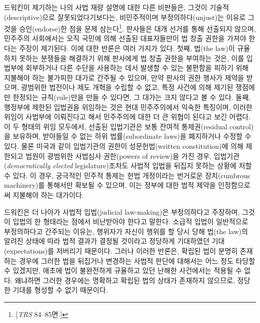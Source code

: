 드워킨이 제기하는 나의 사법 재량 설명에 대한 다른 비판들은, 그것이
기술적(descriptive)으로 잘못되었다기보다는, 비민주적이며
부정의하다(unjust)는 이유로 그것을 승인(endorse)한 점을 문제
삼는다\footnote{{[}\emph{TRS} 84--85면.{]}}. 판사들은 대개 선거를 통해
선출되지 않으며, 민주주의 사회에서는 오직 국민에 의해 선출된
대표자들만이 법 창출 권한을 가져야 한다는 주장이 제기된다. 이에 대한
반론은 여러 가지가 있다. 첫째, 법(the law)이 규율하지 못하는 분쟁들을
해결하기 위해 판사에게 법 창출 권한을 부여하는 것은, 이를 입법부에
회부하거나 다른 수단을 사용하는 데서 발생할 수 있는 불편함을 피하기 위해
지불해야 하는 불가피한 대가로 간주될 수 있으며, 만약 판사의 권한 행사가
제약을 받으며, 광범위한 법전이나 제도 개혁을 수립할 수 없고, 특정 사건에
의해 제기된 쟁점에만 한정되는 규칙(rule)만을 만들 수 있다면, 그 대가는
크지 않다고 볼 수 있다. 둘째, 행정부에 제한된 입법권을 위임하는 것은
현대 민주주의에서 익숙한 특징이며, 이러한 위임이 사법부에 이뤄진다고
해서 민주주의에 대한 더 큰 위협이 된다고 보긴 어렵다. 이 두 형태의 위임
모두에서, 선출된 입법기관은 보통 잔여적 통제권(residual control)을
보유하며, 받아들일 수 없는 하위 법률(subordinate laws)을 폐지하거나
수정할 수 있다. 물론 미국과 같이 입법기관의 권한이 성문헌법(written
constitution)에 의해 제한되고 법원이 광범위한 사법심사 권한(powers of
review)을 가진 경우, 
입법기관(\emph{democratically elected} legislature)조차도 사법적 입법을
뒤집지 못하는 상황에 처할 수 있다. 이 경우, 궁극적인 민주적 통제는 헌법
개정이라는 번거로운 장치(cumbrous machinery)를 통해서만 확보될 수
있으며, 이는 정부에 대한 법적 제약을 인정함으로써 지불해야 하는
대가이다.

드워킨은 더 나아가 사법적 입법(judicial law-making)은 부정의하다고
주장하며, 그것이  입법의 한 형태라는 점에서
비난받아야 한다고 말한다. 소급적 입법이 일반적으로 부정의하다고 간주되는
이유는, 행위자가 자신이 행위를 할 당시 당해 법(the law)의 알려진 상태에
따라 법적 결과가 결정될 것이라고 정당하게 기대하였던
기대(expectations)를 저버리기 때문이다. 그러나 이러한 반론은, 확립된
법이 분명히 존재하는 경우에 그러한 법을 뒤집거나 변경하는 사법적 판단에
대해서는 어느 정도 타당할 수 있겠지만, 애초에 법이 불완전하게 규율하고
있던 난해한 사건에서는 적용될 수 없다. 왜냐하면 그러한 경우에는 명확하고
확립된 법의 상태가 존재하지 않으므로, 정당한 기대를 형성할 수 없기
때문이다.

\newpage

